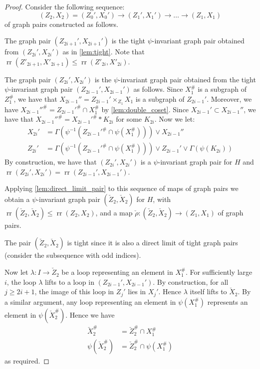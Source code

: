\documentclass[11pt, a4paper]{amsart}
\theoremstyle{definition}
\DeclareMathOperator{\rr}{rr}
\begin{document}
\begin{proof}
Consider the following sequence:
\[
(Z_2, X_2) = (Z_0', X_0') \to (Z_1', X_1')\to \ldots \to (Z_1, X_1)
\]
of graph pairs constructed as follows. 

The graph pair $(Z_{2i+1}', X_{2i+1}')$ is the tight $\psi$-invariant graph pair obtained from $(Z_{2i}', X_{2i}')$ as in \cref{lem:tight}. Note that $\rr(Z'_{2i+1}, X'_{2i+1})\leqslant \rr(Z'_{2i}, X'_{2i})$. 

The graph pair $(Z_{2i}', X_{2i}')$ is the $\psi$-invariant graph pair obtained from the tight $\psi$-invariant graph pair $(Z_{2i-1}', X_{2i-1}')$ as follows. Since $X_1^{\#}$ is a subgraph of $Z_1^{\#}$, we have that $X_{2i-1}'' = Z_{2i-1}'\times_{Z_1}X_1$ is a subgraph of $Z_{2i-1}'$. Moreover, we have $X_{2i-1}''^{\#} = Z_{2i-1}'^{\#}\cap X_1^{\#}$ by \cref{lem:double_coset}. Since $X_{2i-1}'\subset X_{2i-1}''$, we have that $X_{2i-1}''^{\#} = X_{2i-1}'^{\#}*K_{2i}$ for some $K_{2i}$. Now we let:
\begin{align*}
X_{2i}' &= \Gamma(\psi^{-1}(Z_{2i-1}'^{\#}\cap \psi(X_1^{\#})))\vee X_{2i-1}''\\
Z_{2i}' &= \Gamma(\psi^{-1}(Z_{2i-1}'^{\#}\cap \psi(X_1^{\#})))\vee Z_{2i-1}'\vee\Gamma(\psi(K_{2i}))
\end{align*}
By construction, we have that $(Z_{2i}', X_{2i}')$ is a $\psi$-invariant graph pair for $H$ and $\rr(Z_{2i}', X_{2i}') = \rr(Z_{2i-1}', X_{2i-1}')$. 

Applying \cref{lem:direct_limit_pair} to this sequence of maps of graph pairs we obtain a $\psi$-invariant graph pair $(\check{Z}_2, \check{X}_2)$ for $H$, with $\rr(\check{Z}_2, \check{X}_2)\leqslant \rr(Z_2, X_2)$, and a map $\check{\rho}\colon (\check{Z}_2, \check{X}_2)\to (Z_1, X_1)$ of graph pairs. 

The pair $(\check{Z}_2, \check{X}_2)$ is tight since it is also a direct limit of tight graph pairs (consider the subsequence with odd indices). 

Now let $\lambda\colon I\to \check{Z}_2$ be a loop representing an element in $X_1^{\#}$. For sufficiently large $i$, the loop $\lambda$ lifts to a loop in $(Z_{2i-1}', X_{2i-1}')$. By construction, for all $j\geqslant 2i+1$, the image of this loop in $Z_j'$ lies in $X_j'$. Hence $\lambda$ itself lifts to $\check{X}_2$. By a similar argument, any loop representing an element in $\psi(X_1^{\#})$ represents an element in $\psi(\check{X}^{\#}_2)$. Hence we have
\begin{align*}
\check{X}_2^{\#} &= \check{Z}_2^{\#}\cap X_1^{\#}\\
\psi(\check{X}_2^{\#}) &= \check{Z}_2^{\#}\cap \psi(X_1^{\#})
\end{align*}
as required.
\end{proof}
\end{document}
